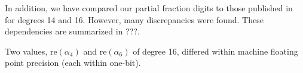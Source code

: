In addition, we have compared our partial fraction digits to those published
in~\cite{pusa2012correction} for degrees 14 and 16. However, many
discrepancies were found. These dependencies are summarized in {\color{red} ???}.

Two values, $\mathrm{re}(\alpha_4)$ and $\mathrm{re}(\alpha_6)$ of degree
16, differed within machine floating point precision (each within one-bit).
